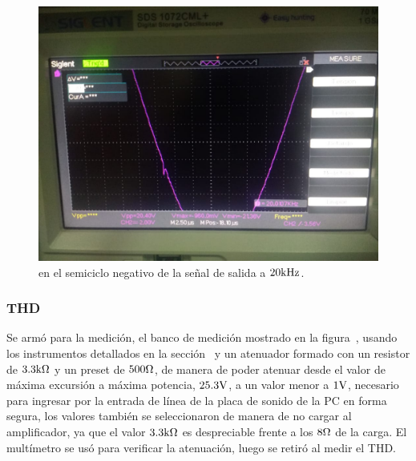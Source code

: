 \vfill

\clearpage


\begin{figure}[H]
        \centering
        \includegraphics[width=0.95 \textwidth]{./img/mediciones/Glitch/negativo.jpg}
        \caption{\textit{} en el semiciclo negativo de la señal de salida a $20 \si[per-mode=symbol]{\kilo\hertz}$.}
        \label{fig:glitch_neg}
\end{figure}



\vfill

\clearpage



\subsubsection{THD}

\label{THD_vs_power}

Se armó para la medición, el banco de medición mostrado en la figura~, usando los instrumentos detallados en la sección~ y un atenuador formado con un resistor de $3.3 \si[per-mode=symbol]{\kilo\ohm}$ y un preset de $500 \si[per-mode=symbol]{\ohm}$, de manera de poder atenuar desde el valor de máxima excursión a máxima potencia, $25.3 \si[per-mode=symbol]{\volt}$, a un valor menor a $1 \si[per-mode=symbol]{\volt}$, necesario para ingresar por la entrada de línea de la placa de sonido de la PC en forma segura, los valores también se seleccionaron de manera de no cargar al amplificador, ya que el valor $3.3 \si[per-mode=symbol]{\kilo\ohm}$ es despreciable frente a los $8 \si[per-mode=symbol]{\ohm}$ de la carga. El multímetro se usó para verificar la atenuación, luego se retiró al medir el THD.


